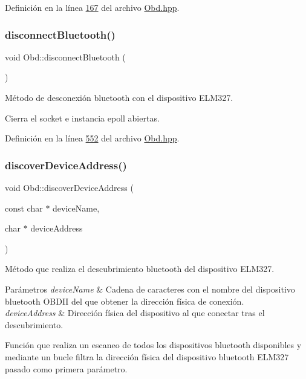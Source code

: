 Definición en la línea \hyperlink{Obd_8hpp_source_l00167}{167} del archivo \hyperlink{Obd_8hpp_source}{Obd.\+hpp}.

\mbox{\label{classObd_a95d02f8f3c48557c5ad799ecb6dd7f79}} 
\subsubsection{\texorpdfstring{disconnect\+Bluetooth()}{disconnectBluetooth()}}
{\footnotesize\ttfamily void Obd\+::disconnect\+Bluetooth (\begin{DoxyParamCaption}{ }\end{DoxyParamCaption})\hspace{0.3cm}{\ttfamily [inline]}}



Método de desconexión bluetooth con el dispositivo E\+L\+M327. 

Cierra el socket e instancia epoll abiertas. 

Definición en la línea \hyperlink{Obd_8hpp_source_l00552}{552} del archivo \hyperlink{Obd_8hpp_source}{Obd.\+hpp}.

\mbox{\label{classObd_a59676f3fa1fd3052216b55be0a79c474}} 
\subsubsection{\texorpdfstring{discover\+Device\+Address()}{discoverDeviceAddress()}}
{\footnotesize\ttfamily void Obd\+::discover\+Device\+Address (\begin{DoxyParamCaption}\item[{const char $\ast$}]{device\+Name,  }\item[{char $\ast$}]{device\+Address }\end{DoxyParamCaption})\hspace{0.3cm}{\ttfamily [inline]}}



Método que realiza el descubrimiento bluetooth del dispositivo E\+L\+M327. 


\begin{DoxyParams}{Parámetros}
{\em device\+Name} & Cadena de caracteres con el nombre del dispositivo bluetooth O\+B\+D\+II del que obtener la dirección física de conexión. \\
\hline
{\em device\+Address} & Dirección física del dispositivo al que conectar tras el descubrimiento.\\
\hline
\end{DoxyParams}
Función que realiza un escaneo de todos los dispositivos bluetooth disponibles y mediante un bucle filtra la dirección física del dispositivo bluetooth E\+L\+M327 pasado como primera parámetro. 

